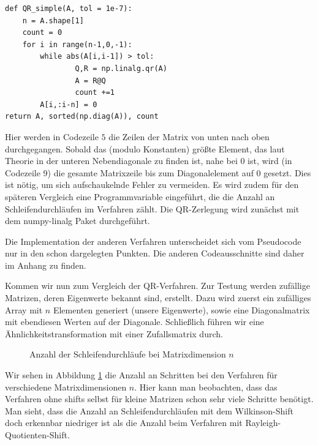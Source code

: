 \documentclass{article}
\theoremstyle{plain}
\begin{document}

\begin{lstlisting}
def QR_simple(A, tol = 1e-7):
	n = A.shape[1]
	count = 0
	for i in range(n-1,0,-1):
		while abs(A[i,i-1]) > tol:
				Q,R = np.linalg.qr(A)
				A = R@Q
				count +=1
		A[i,:i-n] = 0
return A, sorted(np.diag(A)), count
\end{lstlisting}


Hier werden in Codezeile $5$ die Zeilen der Matrix von unten nach oben durchgegangen. Sobald das (modulo Konstanten) größte Element, das laut Theorie in der unteren Nebendiagonale zu finden ist, nahe bei $0$ ist, wird (in Codezeile 9) die gesamte Matrixzeile bis zum Diagonalelement auf 0 gesetzt. Dies ist nötig, um sich aufschaukelnde Fehler zu vermeiden.
Es wird zudem für den späteren Vergleich eine Programmvariable eingeführt, die die Anzahl an Schleifendurchläufen im Verfahren zählt. Die QR-Zerlegung wird zunächst mit dem numpy-linalg Paket durchgeführt.

Die Implementation der anderen Verfahren unterscheidet sich vom Pseudocode nur in den schon dargelegten Punkten. Die anderen Codeausschnitte sind daher im Anhang zu finden.

Kommen wir nun zum Vergleich der QR-Verfahren. Zur Testung werden zufällige Matrizen, deren Eigenwerte bekannt sind, erstellt. Dazu wird zuerst ein zufälliges Array mit $n$ Elementen generiert (unsere Eigenwerte), sowie eine Diagonalmatrix mit ebendiesen Werten auf der Diagonale. Schließlich führen wir eine Ähnlichkeitstransformation mit einer Zufallsmatrix durch.

\begin{figure}[H]
  \centering
  \qquad
  \caption{Anzahl der Schleifendurchläufe bei Matrixdimension $n$}%
  \label{Schleifendurchläufe}
\end{figure}

Wir sehen in Abbildung \ref{Schleifendurchläufe} die Anzahl an Schritten bei den Verfahren für verschiedene Matrixdimensionen $n$. Hier kann man beobachten, dass das Verfahren ohne shifts selbst für kleine Matrizen schon sehr viele Schritte benötigt.  Man sieht, dass die Anzahl an Schleifendurchläufen mit dem Wilkinson-Shift doch erkennbar niedriger ist als die Anzahl beim Verfahren mit Rayleigh-Quotienten-Shift.
\end{document}

